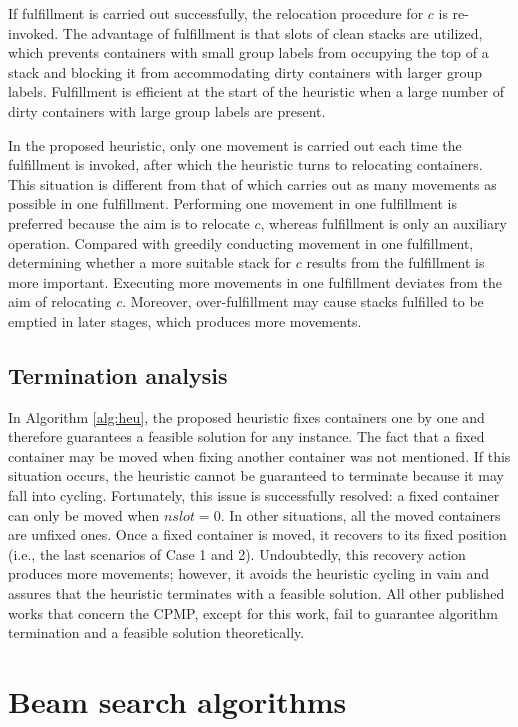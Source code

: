 \documentclass[review,3p,times,authoryear,12pt]{elsarticle}
\begin{document}
If fulfillment is carried out successfully, the relocation procedure for $c$ is re-invoked.
The advantage of fulfillment is that slots of clean stacks are utilized, which prevents containers with small group labels from occupying the top of a stack and blocking it from accommodating dirty containers with larger group labels.
Fulfillment is efficient at the start of the heuristic when a large number of dirty containers with large group labels are present.

In the proposed heuristic, only one movement is carried out each time the fulfillment is invoked, after which the heuristic turns to relocating containers.
This situation is different from that of \cite{Exposito2012} which carries out as many movements as possible in one fulfillment.
Performing one movement in one fulfillment is preferred because the aim is to relocate $c$, whereas fulfillment is only an auxiliary operation.
Compared with greedily conducting movement in one fulfillment, determining whether a more suitable stack for $c$ results from the fulfillment is more important.
Executing more movements in one fulfillment deviates from the aim of relocating $c$.
Moreover, over-fulfillment may cause stacks fulfilled to be emptied in later stages, which produces more movements.

\subsection{Termination analysis}

In Algorithm \ref{alg:heu}, the proposed heuristic fixes containers one by one and therefore guarantees a feasible solution for any instance. The fact that a fixed container may be moved when fixing another container was not mentioned.
If this situation occurs, the heuristic cannot be guaranteed to terminate because it may fall into cycling.
Fortunately, this issue is successfully resolved: a fixed container can only be moved when $\mathit{nslot}=0$.
In other situations, all the moved containers are unfixed ones. Once a fixed container is moved, it recovers to its fixed position (i.e., the last scenarios of Case 1 and 2).
Undoubtedly, this recovery action produces more movements; however, it avoids the heuristic cycling in vain and assures that the heuristic terminates with a feasible solution.
All other published works that concern the CPMP, except for this work, fail to guarantee algorithm termination and a feasible solution theoretically.

\section{Beam search algorithms}
\label{sec:g2la}
\end{document}
